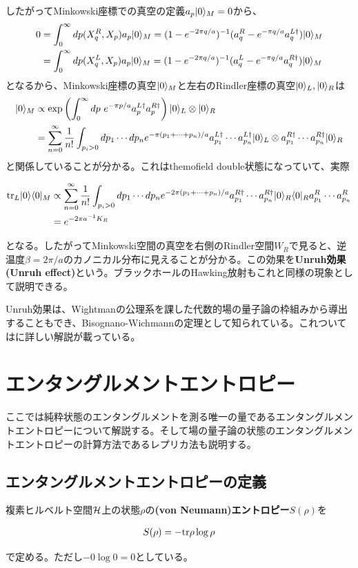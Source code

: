 したがってMinkowski座標での真空の定義$a_p|0\rangle_M=0$から、
\begin{align}
0&=\int_{0}^{\infty} dp (X_q^R,X_p)a_p|0\rangle_M=(1-e^{-2\pi q/a})^{-1}(a_q^R-e^{-\pi q/a}a_q^{L\dagger})|0\rangle_M\\
&=\int_{0}^{\infty} dp (X_q^L,X_p)a_p|0\rangle_M=(1-e^{-2\pi q/a})^{-1}(a_q^L-e^{-\pi q/a}a_q^{R\dagger})|0\rangle_M
\end{align}
となるから、Minkowski座標の真空$|0\rangle_M$と左右のRindler座標の真空$|0\rangle_L,|0\rangle_R$は
\begin{align}
|0\rangle_M &\propto \exp\left(\int_0^\infty dp\  e^{-\pi p/a}a_p^{L\dagger}a_p^{R\dagger} \right)|0\rangle_L\otimes |0\rangle_R\\
&=\sum_{n=0}^{\infty}\frac{1}{n!}\int_{p_i>0} dp_1\cdots dp_n e^{-\pi (p_1+\cdots+p_n)/a}a_{p_1}^{L\dagger}\cdots a_{p_n}^{L\dagger}|0\rangle_L\otimes a_{p_1}^{R\dagger}\cdots a_{p_n}^{R\dagger}|0\rangle_R
\end{align}
と関係していることが分かる。これはthemofield double状態になっていて、実際
\begin{oframed}
\begin{align}
\textnormal{tr}_L|0\rangle\langle0|_M&\propto\sum_{n=0}^{\infty}\frac{1}{n!}\int_{p_i>0} dp_1\cdots dp_n e^{-2\pi (p_1+\cdots+p_n)/a}a_{p_1}^{R\dagger}\cdots a_{p_n}^{R\dagger}|0\rangle_R\langle 0|_R a_{p_1}^{R}\cdots a_{p_n}^{R}\\
&=e^{-2\pi a^{-1}K_R}
\end{align}
\end{oframed}
となる。したがってMinkowski空間の真空を右側のRindler空間$W_R$で見ると、逆温度$\beta=2\pi/a$のカノニカル分布に見えることが分かる。この効果を\textbf{Unruh効果(Unruh effect)}\cite{Unruh1976}という。ブラックホールのHawking放射もこれと同様の現象として説明できる。

Unruh効果は、Wightmanの公理系を課した代数的場の量子論の枠組みから導出することもでき、Bisognano-Wichmannの定理\cite{bisognano1975duality}として知られている。これついては\cite{Araki2001}\cite{haag2012local}に詳しい解説が載っている。

\section{エンタングルメントエントロピー}\label{sec:EE}
ここでは純粋状態のエンタングルメントを測る唯一の量であるエンタングルメントエントロピーについて解説する。そして場の量子論の状態のエンタングルメントエントロピーの計算方法であるレプリカ法も説明する。

\subsection{エンタングルメントエントロピーの定義}
複素ヒルベルト空間$\mathcal{H}$上の状態$\rho$の\textbf{(von Neumann)エントロピー}$S(\rho)$を
\begin{oframed}
\begin{align}
S(\rho)=-\textnormal{tr} \rho\log\rho
\end{align}
\end{oframed}
で定める。ただし$-0\log 0=0$としている。


